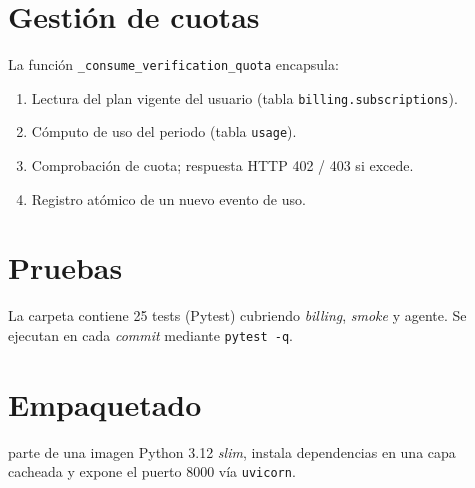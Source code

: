 \section{Gestión de cuotas}

La función \texttt{\_consume\_verification\_quota} encapsula:
\begin{enumerate}[leftmargin=*,itemsep=0.2em]
  \item Lectura del plan vigente del usuario (tabla
        \texttt{billing.subscriptions}).
  \item Cómputo de uso del periodo (tabla \texttt{usage}).
  \item Comprobación de cuota; respuesta HTTP 402 / 403 si excede.
  \item Registro atómico de un nuevo evento de uso.
\end{enumerate}

\section{Pruebas}

La carpeta  contiene 25 tests (Pytest) cubriendo
\emph{billing}, \emph{smoke} y agente. Se ejecutan en cada
\emph{commit} mediante \texttt{pytest -q}.

\section{Empaquetado}

 parte de una imagen Python 3.12 \emph{slim},
instala dependencias en una capa cacheada y expone el puerto 8000 vía
\texttt{uvicorn}.
